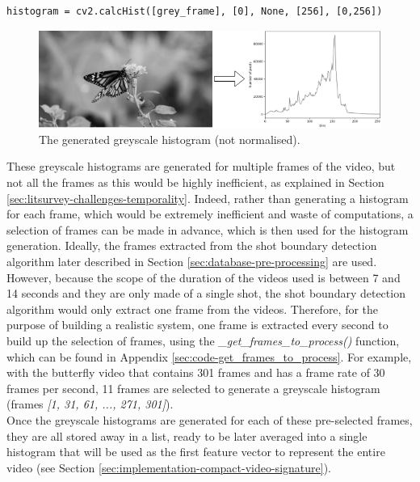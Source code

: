 \begin{lstlisting}[numbers=none]
histogram = cv2.calcHist([grey_frame], [0], None, [256], [0,256])
\end{lstlisting}

\begin{figure}[h] 
\centerline{\includegraphics[width=\textwidth]{figures/implementation/greyscale_not_normalised.png}}
\caption{\label{fig:implementation-greyscale_not_normalised}The generated greyscale histogram (not normalised).}
\end{figure}

These greyscale histograms are generated for multiple frames of the video, but not all the frames as this would be highly inefficient, as explained in Section \ref{sec:litsurvey-challenges-temporality}. Indeed, rather than generating a histogram for each frame, which would be extremely inefficient and waste of computations, a selection of frames can be made in advance, which is then used for the histogram generation. Ideally, the frames extracted from the shot boundary detection algorithm later described in Section \ref{sec:database-pre-processing} are used. However, because the scope of the duration of the videos used is between 7 and 14 seconds and they are only made of a single shot, the shot boundary detection algorithm would only extract one frame from the videos. Therefore, for the purpose of building a realistic system, one frame is extracted every second to build up the selection of frames, using the \textit{\_get\_frames\_to\_process()} function, which can be found in Appendix \ref{sec:code-get_frames_to_process}. For example, with the butterfly video that contains 301 frames and has a frame rate of 30 frames per second, 11 frames are selected to generate a greyscale histogram (frames \textit{[1, 31, 61, ..., 271, 301]}).\\

Once the greyscale histograms are generated for each of these pre-selected frames, they are all stored away in a list, ready to be later averaged into a single histogram that will be used as the first feature vector to represent the entire video (see Section \ref{sec:implementation-compact-video-signature}).

